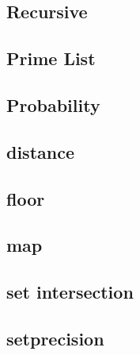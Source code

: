     \subsection{Recursive}
            
    \subsection{Prime List}
            
    \subsection{Probability}
            
    \subsection{distance}
            
    \subsection{floor}
            
    \subsection{map}
            
    \subsection{set intersection}
            
    \subsection{setprecision}
            